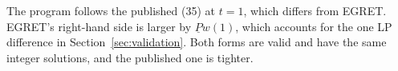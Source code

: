 \documentclass[11pt]{article}
\newcommand{\Pmin}{\underline{P}}
\begin{document}
The program follows the published (35) at $t=1$, which differs from EGRET. EGRET's right-hand side is larger by $\Pmin w(1)$, which accounts for the one LP difference in Section~\ref{sec:validation}. Both forms are valid and have the same integer solutions, and the published one is tighter.



\end{document}
